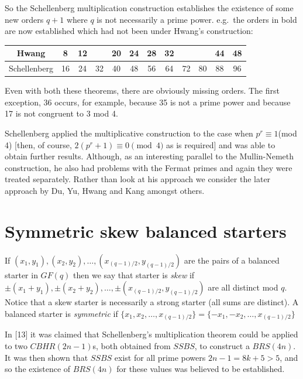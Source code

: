 \documentclass[
  11pt,
  a4paper]{book}
\begin{document}
So the Schellenberg multiplication construction establishes
the existence of some new orders \(q + 1\) where \(q\) is not
necessarily a prime power. e.g.~the orders in bold are now
established which had not been under Hwang's construction:

\begin{tabular}{|c|c|c|c|c|c|c|c|c|c|c|c|}
\hline
   Hwang     &  8 & 12 &    & 20 & 24 & 28 & 32 &    &    & 44 & 48 \\ \hline
Schellenberg & 16 & 24 & 32 & 40 & 48 & 56 & 64 & 72 & 80 & 88 & 96 \\ \hline
\end{tabular}

Even with both these theorems, there are obviously missing
orders. The first exception, 36 occurs, for example, because
35 is not a prime power and because 17 is not congruent to 3
mod 4.

Schellenberg applied the multiplicative construction to the
case when \(p^r \equiv 1\)(mod 4) {[}then, of course,
\(2(p^r + 1) \equiv 0\pmod 4\) as is required{]} and was able to
obtain further results. Although, as an interesting parallel
to the Mullin-Nemeth construction, he also had problems with
the Fermat primes and again they were treated separately.
Rather than look at his approach we consider the later
approach by Du, Yu, Hwang and Kang amongst others.

\hypertarget{symmetric-skew-balanced-starters}{%
\section{Symmetric skew balanced starters}\label{symmetric-skew-balanced-starters}}

If \((x_1, y_1), (x_2, y_2),\ldots, (x_{(q - 1)/2}, y_{(q - 1)/2})\)
are the pairs of a balanced starter in \(GF(q)\) then we say
that starter is \emph{skew} if
\(\pm(x_1 + y_1), \pm(x_2 + y_2),\ldots, \pm(x_{(q - 1)/2}, y_{(q - 1)/2})\)
are all distinct mod \(q\).
Notice that a skew starter is necessarily a strong starter
(all sums are distinct). A balanced starter is \emph{symmetric} if
\(\{x_1, x_2,\ldots, x_{(q - 1)/2}\} = \{-x_1, -x_2,\ldots, x_{(q - 1)/2}\}\)

In {[}13{]} it was claimed that Schellenberg's multiplication
theorem could be applied to two \(CBHR(2n-1)\)s, both obtained
from \(SSBS\), to construct a \(BRS(4n)\). It was then shown
that \(SSBS\) exist for all prime powers \(2n - 1 = 8k + 5 > 5\),
and so the existence of \(BRS(4n)\) for these values was
believed to be established.
\end{document}
